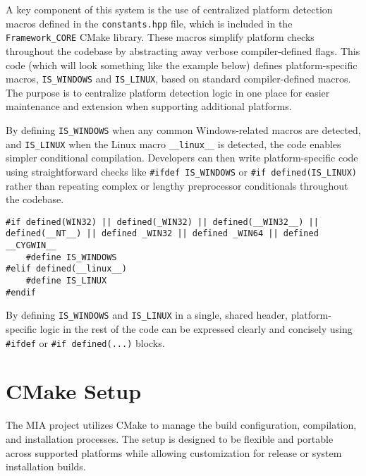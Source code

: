 A key component of this system is the use of centralized platform detection macros defined in the \texttt{constants.hpp} file, which is included in the \texttt{Framework\_CORE} CMake library. These macros simplify platform checks throughout the codebase by abstracting away verbose compiler-defined flags. This code (which will look something like the example below) defines platform-specific macros, \texttt{IS\_WINDOWS} and \texttt{IS\_LINUX}, based on standard compiler-defined macros. The purpose is to centralize platform detection logic in one place for easier maintenance and extension when supporting additional platforms.

By defining \texttt{IS\_WINDOWS} when any common Windows-related macros are detected, and \texttt{IS\_LINUX} when the Linux macro \texttt{\_\_linux\_\_} is detected, the code enables simpler conditional compilation. Developers can then write platform-specific code using straightforward checks like \texttt{\#ifdef IS\_WINDOWS} or \texttt{\#if defined(IS\_LINUX)} rather than repeating complex or lengthy preprocessor conditionals throughout the codebase.

\begin{lstlisting}[style=cppstyle]
#if defined(WIN32) || defined(_WIN32) || defined(__WIN32__) || defined(__NT__) || defined _WIN32 || defined _WIN64 || defined __CYGWIN__
	#define IS_WINDOWS
#elif defined(__linux__)
	#define IS_LINUX
#endif
\end{lstlisting}

By defining \texttt{IS\_WINDOWS} and \texttt{IS\_LINUX} in a single, shared header, platform-specific logic in the rest of the code can be expressed clearly and concisely using \texttt{\#ifdef} or \texttt{\#if defined(...)} blocks.















\section{CMake Setup}
\label{sec:CMake-setup}

The MIA project utilizes CMake to manage the build configuration, compilation, and installation processes. The setup is designed to be flexible and portable across supported platforms while allowing customization for release or system installation builds.

